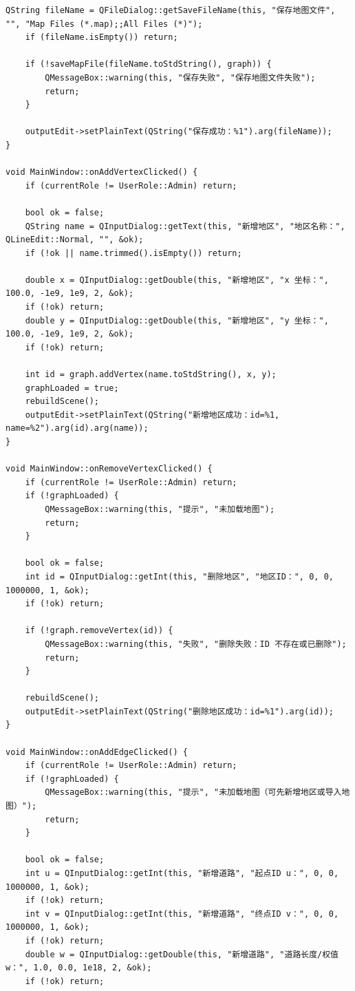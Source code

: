 \documentclass[UTF8,12pt,a4paper]{ctexart}
\begin{document}
\begin{lstlisting}[caption={mainwindow.cpp 源码}]
    QString fileName = QFileDialog::getSaveFileName(this, "保存地图文件", "", "Map Files (*.map);;All Files (*)");
    if (fileName.isEmpty()) return;

    if (!saveMapFile(fileName.toStdString(), graph)) {
        QMessageBox::warning(this, "保存失败", "保存地图文件失败");
        return;
    }

    outputEdit->setPlainText(QString("保存成功：%1").arg(fileName));
}

void MainWindow::onAddVertexClicked() {
    if (currentRole != UserRole::Admin) return;

    bool ok = false;
    QString name = QInputDialog::getText(this, "新增地区", "地区名称：", QLineEdit::Normal, "", &ok);
    if (!ok || name.trimmed().isEmpty()) return;

    double x = QInputDialog::getDouble(this, "新增地区", "x 坐标：", 100.0, -1e9, 1e9, 2, &ok);
    if (!ok) return;
    double y = QInputDialog::getDouble(this, "新增地区", "y 坐标：", 100.0, -1e9, 1e9, 2, &ok);
    if (!ok) return;

    int id = graph.addVertex(name.toStdString(), x, y);
    graphLoaded = true;
    rebuildScene();
    outputEdit->setPlainText(QString("新增地区成功：id=%1, name=%2").arg(id).arg(name));
}

void MainWindow::onRemoveVertexClicked() {
    if (currentRole != UserRole::Admin) return;
    if (!graphLoaded) {
        QMessageBox::warning(this, "提示", "未加载地图");
        return;
    }

    bool ok = false;
    int id = QInputDialog::getInt(this, "删除地区", "地区ID：", 0, 0, 1000000, 1, &ok);
    if (!ok) return;

    if (!graph.removeVertex(id)) {
        QMessageBox::warning(this, "失败", "删除失败：ID 不存在或已删除");
        return;
    }

    rebuildScene();
    outputEdit->setPlainText(QString("删除地区成功：id=%1").arg(id));
}

void MainWindow::onAddEdgeClicked() {
    if (currentRole != UserRole::Admin) return;
    if (!graphLoaded) {
        QMessageBox::warning(this, "提示", "未加载地图（可先新增地区或导入地图）");
        return;
    }

    bool ok = false;
    int u = QInputDialog::getInt(this, "新增道路", "起点ID u：", 0, 0, 1000000, 1, &ok);
    if (!ok) return;
    int v = QInputDialog::getInt(this, "新增道路", "终点ID v：", 0, 0, 1000000, 1, &ok);
    if (!ok) return;
    double w = QInputDialog::getDouble(this, "新增道路", "道路长度/权值 w：", 1.0, 0.0, 1e18, 2, &ok);
    if (!ok) return;


\end{lstlisting}
\end{document}
